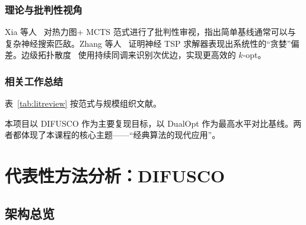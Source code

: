 \documentclass[11pt,a4paper]{ctexart}
\begin{document}
\subsubsection{理论与批判性视角}

Xia 等人~\cite{xia2024position} 对热力图+ MCTS 范式进行了批判性审视，指出简单基线通常可以与复杂神经搜索匹敌。Zhang 等人~\cite{zhang2025greedy} 证明神经 TSP 求解器表现出系统性的``贪婪''偏差。边级拓扑散度~\cite{edge2025} 使用持续同调来识别次优边，实现更高效的 $k$-opt。

\subsubsection{相关工作总结}

表~\ref{tab:litreview} 按范式与规模组织文献。

\begin{table}[H]
\centering
\caption{按范式和最大测试规模组织的相关工作。}
\label{tab:litreview}
\end{table}

本项目以 DIFUSCO 作为主要复现目标，以 DualOpt 作为最高水平对比基线。两者都体现了本课程的核心主题——``经典算法的现代应用''。

\section{代表性方法分析：DIFUSCO}

\subsection{架构总览}
\end{document}
